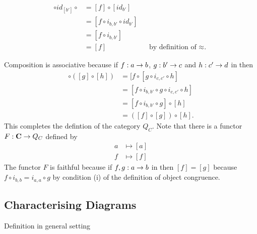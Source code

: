 \documentclass[10pt,a4paper]{scrartcl}
\begin{document}
\begin{align*}
[f] \circ id_{[b']} \circ  & = [f]  \circ [id_{b'}]                                     \\
                 &=  [f \circ i_{b,b'} \circ id_{b'} ]                                  \\
                 &=  [f \circ i_{b,b'} ]                                                \\
                 &=  [f]                & &\mbox {by definition of $\approx$. }
\end{align*}


Composition is associative because if $f:a \rightarrow b$, $g: b' \rightarrow c$  and $h: c' \rightarrow d$ in \catcw then
\begin{align*}
[f] \circ ([g] \circ [h]) &= [f \circ [g \circ i_{c,c'} \circ h]               \\
                          &= [f \circ i_{b,b'} \circ g \circ i_{c,c'} \circ h] \\
													&= [f \circ i_{b,b'} \circ g] \circ [h]              \\
													&= ([f] \circ [g]) \circ [h].
\end{align*}
This completes the defintion of the category $Q_C$.
Note that there is a functor $F: \textbf{C} \rightarrow Q_C$ defined by
\begin{align*}
       a & \mapsto [a] \\
			 f & \mapsto [f]
\end{align*}
The functor $F$ is faithful because if $f,g : a \rightarrow b$ in \catcw then $[f]=[g]$ because $f \circ i_{b,b}=i_{a,a} \circ g$ by condition (i) of the definition of object congruence.
\newpage



\subsection{Characterising Diagrams}
Definition in general setting










\end{document}
